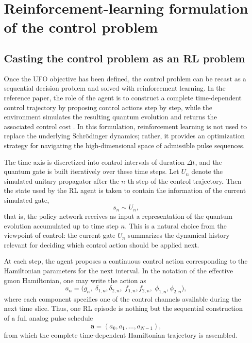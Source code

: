 \section{Reinforcement-learning formulation of the control problem}
\subsection{Casting the control problem as an RL problem}
\label{subsec:paper_rl_formulation}

Once the UFO objective has been defined, the control problem can be recast as a sequential decision problem and solved with reinforcement learning. In the reference paper, the role of the agent is to construct a complete time-dependent control trajectory by proposing control actions step by step, while the environment simulates the resulting quantum evolution and returns the associated control cost \cite{Niu2019}. In this formulation, reinforcement learning is not used to replace the underlying Schr\"odinger dynamics; rather, it provides an optimization strategy for navigating the high-dimensional space of admissible pulse sequences.

The time axis is discretized into control intervals of duration \(\Delta t\), and the quantum gate is built iteratively over these time steps. Let \(U_n\) denote the simulated unitary propagator after the \(n\)-th step of the control trajectory. Then the state used by the RL agent is taken to contain the information of the current simulated gate,
\begin{equation}
s_n \sim U_n,
\label{eq:paper_rl_state}
\end{equation}
that is, the policy network receives as input a representation of the quantum evolution accumulated up to time step \(n\). This is a natural choice from the viewpoint of control: the current gate \(U_n\) summarizes the dynamical history relevant for deciding which control action should be applied next.

At each step, the agent proposes a continuous control action corresponding to the Hamiltonian parameters for the next interval. In the notation of the effective gmon Hamiltonian, one may write the action as
\begin{equation}
a_n
=
\bigl(
g_n,\;
\delta_{1,n},\delta_{2,n},\;
f_{1,n},f_{2,n},\;
\phi_{1,n},\phi_{2,n}
\bigr),
\label{eq:paper_rl_action}
\end{equation}
where each component specifies one of the control channels available during the next time slice. Thus, one RL episode is nothing but the sequential construction of a full analog pulse schedule
\begin{equation}
\bm{a}
=
(a_0,a_1,\dots,a_{N-1}),
\label{eq:control_trajectory_discrete}
\end{equation}
from which the complete time-dependent Hamiltonian trajectory is assembled.

